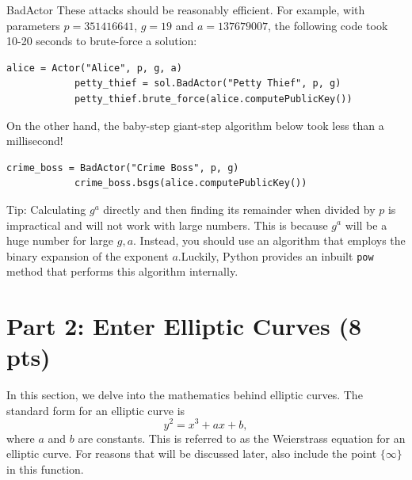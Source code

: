 \documentclass{article}
\begin{document}
\begin{tcolorbox}[enhanced,interior style={top color=Plum!20,bottom color=Plum!30}]
\begin{mybox}[
            colframe=purple!50!black,
            colback=purple!30,
            colbacktitle=purple!50!white,
            coltitle=purple!30!black,
            ]{BadActor}
        These attacks should be reasonably efficient. For example, with parameters $p = 351416641$, $g = 19$ and $a = 137679007$, the following code took 10-20 seconds to brute-force a solution:
        \begin{lstlisting}[belowskip=-6pt]
            alice = Actor("Alice", p, g, a)
            petty_thief = sol.BadActor("Petty Thief", p, g)
            petty_thief.brute_force(alice.computePublicKey())
        \end{lstlisting}
        On the other hand, the baby-step giant-step algorithm below took less than a millisecond!
        \begin{lstlisting}[belowskip=-10pt]
            crime_boss = BadActor("Crime Boss", p, g)
            crime_boss.bsgs(alice.computePublicKey())
        \end{lstlisting}
        
        \end{mybox}
    
        \vspace{2mm}
        Tip: Calculating $g^{a}$ directly and then finding its remainder when divided by $p$ is impractical and will not work with large numbers. This is because $g^{a}$ will be a huge number for large $g, a$. Instead, you should use an algorithm that employs the binary expansion of the exponent $a$.\footnotemark Luckily, Python provides an inbuilt \lstinline{pow} method that performs this algorithm internally.
    \end{tcolorbox}



\section*{Part 2: Enter Elliptic Curves (8 pts)}
    In this section, we delve into the mathematics behind elliptic curves. The standard form for an elliptic curve is $$y^{2} = x^{3} + ax + b,$$ where $a$ and $b$ are constants. This is referred to as the Weierstrass equation for an elliptic curve. For reasons that will be discussed later, also include the point $\{\infty\}$ in this function.
\end{document}
